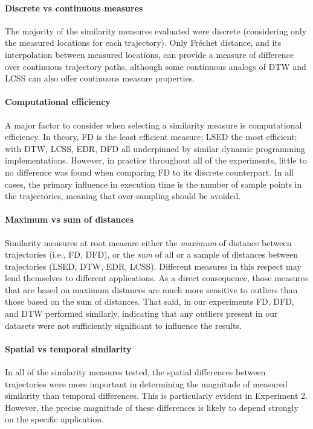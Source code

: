 \documentclass[10pt,letterpaper]{article}
\begin{document}
\paragraph{Discrete vs continuous measures} The majority of the similarity measures evaluated were discrete (considering only the measured locations for each trajectory). Only Fréchet distance, and its interpolation between measured locations, can provide a measure of difference over continuous trajectory paths, although some continuous analogs of DTW and LCSS can also offer continuous measure properties. 

\paragraph{Computational efficiency} A major factor to consider when selecting a similarity measure is computational efficiency. In theory, FD is the least efficient measure; LSED the most efficient; with DTW, LCSS, EDR, DFD all underpinned by similar dynamic programming implementations. However, in practice throughout all of the experiments, little to no difference was found when comparing FD to its discrete counterpart. In all cases, the primary influence in execution time is the number of sample points in the trajectories, meaning that over-sampling should be avoided.

\paragraph{Maximum vs sum of distances} %
Similarity measures at root measure either the \textit{maximum} of distance between trajectories (i.e., FD, DFD), or the \textit{sum} of all or a sample of distances  between trajectories (LSED, DTW, EDR, LCSS). Different measures in this respect may lend themselves to different applications. As a direct consequence, those measures that are based on maximum distances are much more sensitive to outliers than those based on the sum of distances. That said, in our experiments FD, DFD, and DTW performed similarly, indicating that any outliers present in our datasets were not sufficiently significant to influence the results.
 	
\paragraph{Spatial vs temporal similarity}
In all of the similarity measures tested, the spatial differences between trajectories were more important in determining the magnitude of measured similarity than temporal differences. This is particularly evident in Experiment 2. However, the precise  magnitude of these differences is likely to depend strongly on the specific application.
\end{document}
